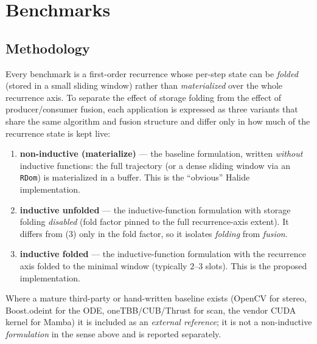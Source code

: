 
\section{Benchmarks}
\label{sec:benchmarks}

\subsection{Methodology}
\label{sec:methodology}

Every benchmark is a first-order recurrence whose per-step state can be
\emph{folded} (stored in a small sliding window) rather than \emph{materialized}
over the whole recurrence axis. To separate the effect of storage folding from
the effect of producer/consumer fusion, each application is expressed as three
variants that share the same algorithm and fusion structure and differ only in
how much of the recurrence state is kept live:

\begin{enumerate}
  \item \textbf{non-inductive (materialize)} --- the baseline formulation, written
    \emph{without} inductive functions: the full trajectory (or a dense sliding
    window via an \texttt{RDom}) is materialized in a buffer. This is the
    ``obvious'' Halide implementation.
  \item \textbf{inductive unfolded} --- the inductive-function formulation with
    storage folding \emph{disabled} (fold factor pinned to the full
    recurrence-axis extent). It differs from (3) only in the fold factor, so it
    isolates \emph{folding} from \emph{fusion}.
  \item \textbf{inductive folded} --- the inductive-function formulation with the
    recurrence axis folded to the minimal window (typically $2$--$3$ slots). This
    is the proposed implementation.
\end{enumerate}

Where a mature third-party or hand-written baseline exists (OpenCV for stereo,
Boost.odeint for the ODE, oneTBB/CUB/Thrust for scan, the vendor CUDA kernel for
Mamba) it is included as an \emph{external reference}; it is not a non-inductive
\emph{formulation} in the sense above and is reported separately.

